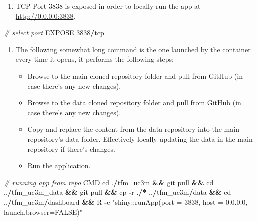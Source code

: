 \documentclass[
  a4paper]{article}
\newenvironment{Shaded}{\begin{snugshade}}{\end{snugshade}}
\newcommand{\CommentTok}[1]{\textcolor[rgb]{0.56,0.35,0.01}{\textit{#1}}}
\newcommand{\DecValTok}[1]{\textcolor[rgb]{0.00,0.00,0.81}{#1}}
\newcommand{\NormalTok}[1]{#1}
\newcommand{\OperatorTok}[1]{\textcolor[rgb]{0.81,0.36,0.00}{\textbf{#1}}}
\newcommand{\StringTok}[1]{\textcolor[rgb]{0.31,0.60,0.02}{#1}}
\providecommand{\tightlist}{%
  \setlength{\itemsep}{0pt}\setlength{\parskip}{0pt}}
\begin{document}
\newpage

\begin{enumerate}
\def\labelenumi{\arabic{enumi}.}
\setcounter{enumi}{5}
\tightlist
\item
  TCP Port 3838 is exposed in order to locally run the app at
  \textcolor{blue}{\url{http://0.0.0.0:3838}}.
\end{enumerate}

\footnotesize

\begin{Shaded}
\begin{Highlighting}[]
\CommentTok{\# select port}
\NormalTok{EXPOSE }\DecValTok{3838}\OperatorTok{/}\NormalTok{tcp}
\end{Highlighting}
\end{Shaded}

\normalsize

\begin{enumerate}
\def\labelenumi{\arabic{enumi}.}
\setcounter{enumi}{6}
\item
  The following somewhat long command is the one launched by the
  container every time it opens, it performs the following steps:

  \begin{itemize}
  \item
    Browse to the main cloned repository folder and pull from GitHub (in
    case there's any new changes).
  \item
    Browse to the data cloned repository folder and pull from GitHub (in
    case there's any new changes).
  \item
    Copy and replace the content from the data repository into the main
    repository's data folder. Effectively locally updating the data in
    the main repository if there's changes.
  \item
    Run the application.
  \end{itemize}
\end{enumerate}

\footnotesize

\begin{Shaded}
\begin{Highlighting}[]
\CommentTok{\# running app from repo}
\NormalTok{CMD cd .}\OperatorTok{/}\NormalTok{tfm\_uc3m }\OperatorTok{\&\&}\NormalTok{ git pull }\OperatorTok{\&\&}\NormalTok{ cd ..}\OperatorTok{/}\NormalTok{tfm\_uc3m\_data }\OperatorTok{\&\&} 
\NormalTok{    git pull }\OperatorTok{\&\&}\NormalTok{ cp }\OperatorTok{{-}}\NormalTok{r .}\OperatorTok{/*}\NormalTok{ ..}\OperatorTok{/}\NormalTok{tfm\_uc3m}\OperatorTok{/}\NormalTok{data }\OperatorTok{\&\&} 
\NormalTok{    cd ..}\OperatorTok{/}\NormalTok{tfm\_uc3m}\OperatorTok{/}\NormalTok{dashboard }\OperatorTok{\&\&} 
\NormalTok{    R }\OperatorTok{{-}}\NormalTok{e }\StringTok{"shiny::runApp(port = 3838, host = \textquotesingle{}0.0.0.0\textquotesingle{}, launch.browser=FALSE)"}
\end{Highlighting}
\end{Shaded}
\end{document}
